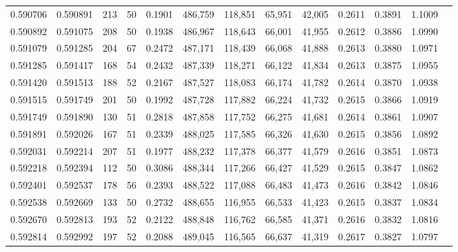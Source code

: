 \begin{tabular}{rrrrrrrrrrrrr}
0.590706 & 0.590891 &   213 &  50 &                                     0.1901 & 486,759 & 118,851 &  65,951 &  42,005 & 0.2611 & 0.3891 & 1.1009 \\
0.590892 & 0.591075 &   208 &  50 &                                     0.1938 & 486,967 & 118,643 &  66,001 &  41,955 & 0.2612 & 0.3886 & 1.0990 \\
0.591079 & 0.591285 &   204 &  67 &                                     0.2472 & 487,171 & 118,439 &  66,068 &  41,888 & 0.2613 & 0.3880 & 1.0971 \\
0.591285 & 0.591417 &   168 &  54 &                                     0.2432 & 487,339 & 118,271 &  66,122 &  41,834 & 0.2613 & 0.3875 & 1.0955 \\
0.591420 & 0.591513 &   188 &  52 &                                     0.2167 & 487,527 & 118,083 &  66,174 &  41,782 & 0.2614 & 0.3870 & 1.0938 \\
0.591515 & 0.591749 &   201 &  50 &                                     0.1992 & 487,728 & 117,882 &  66,224 &  41,732 & 0.2615 & 0.3866 & 1.0919 \\
0.591749 & 0.591890 &   130 &  51 &                                     0.2818 & 487,858 & 117,752 &  66,275 &  41,681 & 0.2614 & 0.3861 & 1.0907 \\
0.591891 & 0.592026 &   167 &  51 &                                     0.2339 & 488,025 & 117,585 &  66,326 &  41,630 & 0.2615 & 0.3856 & 1.0892 \\
0.592031 & 0.592214 &   207 &  51 &                                     0.1977 & 488,232 & 117,378 &  66,377 &  41,579 & 0.2616 & 0.3851 & 1.0873 \\
0.592218 & 0.592394 &   112 &  50 &                                     0.3086 & 488,344 & 117,266 &  66,427 &  41,529 & 0.2615 & 0.3847 & 1.0862 \\
0.592401 & 0.592537 &   178 &  56 &                                     0.2393 & 488,522 & 117,088 &  66,483 &  41,473 & 0.2616 & 0.3842 & 1.0846 \\
0.592538 & 0.592669 &   133 &  50 &                                     0.2732 & 488,655 & 116,955 &  66,533 &  41,423 & 0.2615 & 0.3837 & 1.0834 \\
0.592670 & 0.592813 &   193 &  52 &                                     0.2122 & 488,848 & 116,762 &  66,585 &  41,371 & 0.2616 & 0.3832 & 1.0816 \\
0.592814 & 0.592992 &   197 &  52 &                                     0.2088 & 489,045 & 116,565 &  66,637 &  41,319 & 0.2617 & 0.3827 & 1.0797 \\

\end{tabular}
